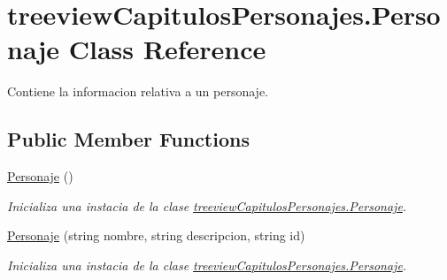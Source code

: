 \hypertarget{classtreeview_capitulos_personajes_1_1_personaje}{\section{treeview\-Capitulos\-Personajes.\-Personaje Class Reference}
\label{classtreeview_capitulos_personajes_1_1_personaje}
}


Contiene la informacion relativa a un personaje.  


\subsection*{Public Member Functions}
\begin{DoxyCompactItemize}
\item 
\hyperlink{classtreeview_capitulos_personajes_1_1_personaje_ac67a107995b870a6a6a74b660d17d9fa}{Personaje} ()
\begin{DoxyCompactList}\small\item\em Inicializa una instacia de la clase \hyperlink{classtreeview_capitulos_personajes_1_1_personaje}{treeview\-Capitulos\-Personajes.\-Personaje}. \end{DoxyCompactList}\item 
\hyperlink{classtreeview_capitulos_personajes_1_1_personaje_a6380aac9fdc17f16126be6d5f0667029}{Personaje} (string nombre, string descripcion, string id)
\begin{DoxyCompactList}\small\item\em Inicializa una instacia de la clase \hyperlink{classtreeview_capitulos_personajes_1_1_personaje}{treeview\-Capitulos\-Personajes.\-Personaje}. \end{DoxyCompactList}\end{DoxyCompactItemize}
